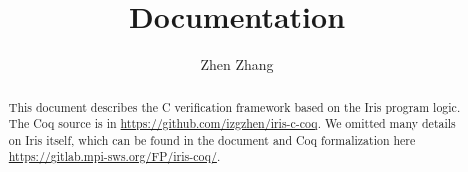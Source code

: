 \documentclass[10pt]{article}
\title{\bfseries \irisc{} Documentation}
\author{Zhen Zhang}
\begin{document}
\maketitle
\thispagestyle{empty}
\vfill
\begin{abstract}
  This document describes the C verification framework based on the Iris program logic.
  The Coq source is in \url{https://github.com/izgzhen/iris-c-coq}.
  We omitted many details on Iris itself,
  which can be found in the document and Coq formalization here \url{https://gitlab.mpi-sws.org/FP/iris-coq/}.
\end{abstract}

\clearpage
\tableofcontents
\clearpage

\begingroup

\endgroup
\clearpage

\begingroup

\endgroup
\clearpage

\begingroup

\endgroup
\clearpage

\begingroup

\endgroup
\clearpage

\begingroup

\endgroup
\clearpage
\end{document}
